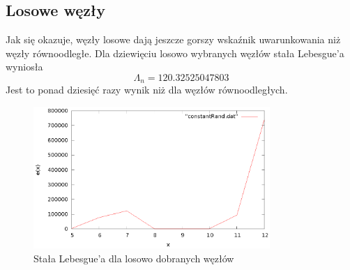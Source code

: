 \documentclass{article}
\begin{document}
\subsection{Losowe węzły}
Jak się okazuje, węzły losowe dają jeszcze gorszy wskaźnik uwarunkowania niż węzły równoodległe.
Dla dziewięciu losowo wybranych węzłów stała Lebesgue'a wyniosła
\begin{equation*}
\Lambda_n = 120.32525047803
\end{equation*}
Jest to ponad dziesięć razy wynik niż dla węzłów równoodległych.

\begin{figure}[H]
    \centering
    \includegraphics[width=0.8\textwidth]{wykresy/constantRand.eps}
    \caption{Stała Lebesgue'a dla losowo dobranych węzłów}
\end{figure}
\end{document}
